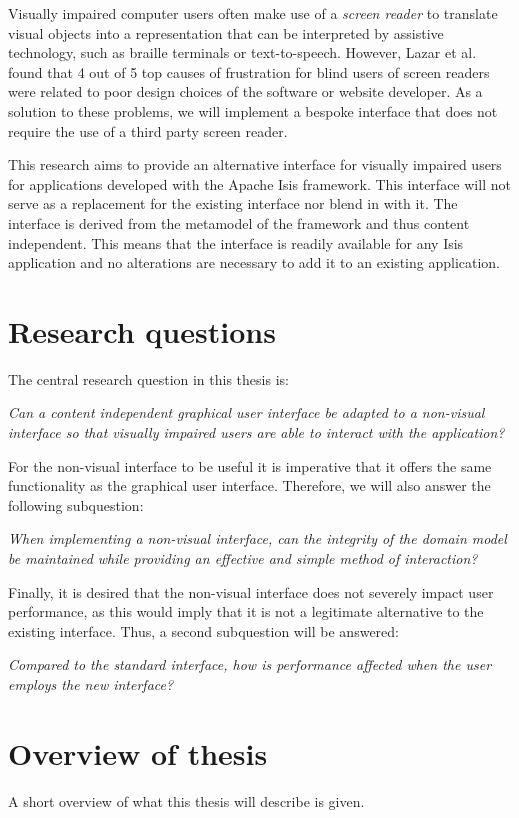Visually impaired computer users often make use of a \textit{screen reader} to translate visual objects into a representation that can be interpreted by assistive technology, such as braille terminals or text-to-speech. However, Lazar et al. found that 4 out of 5 top causes of frustration for blind users of screen readers were related to poor design choices of the software or website developer\cite{lazar2007frustrates}. As a solution to these problems, we will implement a bespoke interface that does not require the use of a third party screen reader.

This research aims to provide an alternative interface for visually impaired users for applications developed with the Apache Isis\cite{Apach60:online} framework. This interface will not serve as a replacement for the existing interface nor blend in with it. The interface is derived from the metamodel of the framework and thus content independent. This means that the interface is readily available for any Isis application and no alterations are necessary to add it to an existing application.

\section{Research questions}
\label{section:researchquestions}
The central research question in this thesis is:
\begin{displayquote}
\textit{Can a content independent graphical user interface be adapted to a non-visual interface so that visually impaired users are able to interact with the application?}
\end{displayquote}

For the non-visual interface to be useful it is imperative that it offers the same functionality as the graphical user interface. Therefore, we will also answer the following subquestion:
\begin{displayquote}
\textit{When implementing a non-visual interface, can the integrity of the domain model be maintained while providing an effective and simple method of interaction?}
\end{displayquote}

Finally, it is desired that the non-visual interface does not severely impact user performance, as this would imply that it is not a legitimate alternative to the existing interface. Thus, a second subquestion will be answered:
\begin{displayquote}
\textit{Compared to the standard interface, how is performance affected when the user employs the new interface?}
\end{displayquote}

\section{Overview of thesis}
\label{section:overviewofthesis}
A short overview of what this thesis will describe is given.